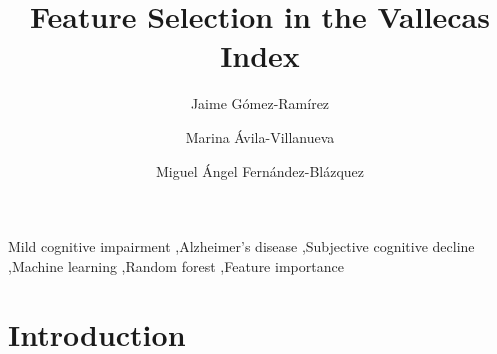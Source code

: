 \documentclass[preprint,12pt]{elsarticle}
\begin{document}
\begin{frontmatter}



\title{Feature Selection in the Vallecas Index}


\author{Jaime Gómez-Ramírez}
\author{Marina Ávila-Villanueva}
\author{Miguel Ángel Fernández-Blázquez}

\address{Fundaci\'on Reina Sof\'ia \\     Centre for Research in Neurodegenarative Diseases (Fundaci\'on CIEN) \\ \emph{Valderrebollo, 5, 28031 Madrid, Spain}}


\begin{abstract}

\end{abstract}

\begin{keyword}
Mild cognitive impairment \sep  Alzheimer's disease \sep Subjective cognitive decline \sep Machine learning \sep Random forest \sep Feature importance


\end{keyword}

\end{frontmatter}

\linenumbers

\section{Introduction}
\label{se:intro}
\end{document}
